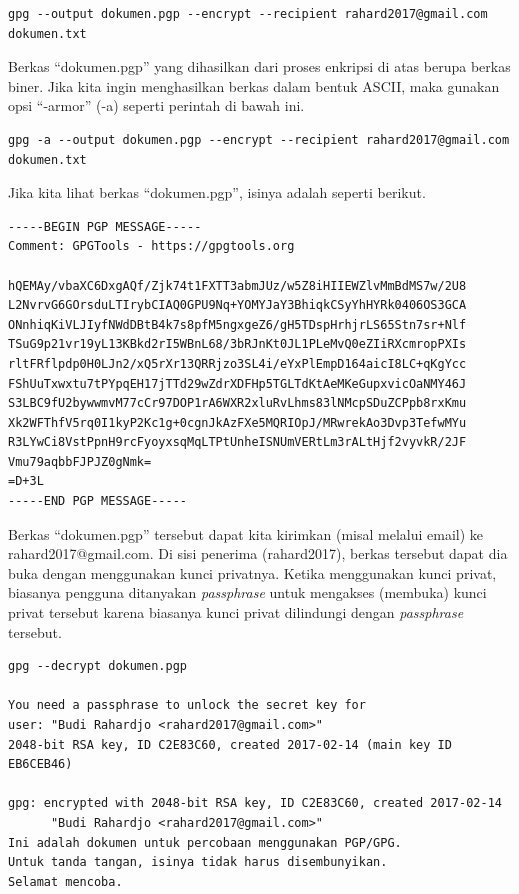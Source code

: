 \begin{verbatim}
gpg --output dokumen.pgp --encrypt --recipient rahard2017@gmail.com dokumen.txt
\end{verbatim}

Berkas ``dokumen.pgp'' yang dihasilkan dari proses enkripsi di atas berupa
berkas biner. Jika kita ingin menghasilkan berkas dalam bentuk ASCII, maka
gunakan opsi ``-armor'' (-a) seperti perintah di bawah ini.

\begin{verbatim}
gpg -a --output dokumen.pgp --encrypt --recipient rahard2017@gmail.com dokumen.txt
\end{verbatim}

Jika kita lihat berkas ``dokumen.pgp'', isinya adalah seperti berikut.

\begin{mdframed}
\begin{verbatim}
-----BEGIN PGP MESSAGE-----
Comment: GPGTools - https://gpgtools.org

hQEMAy/vbaXC6DxgAQf/Zjk74t1FXTT3abmJUz/w5Z8iHIIEWZlvMmBdMS7w/2U8
L2NvrvG6GOrsduLTIrybCIAQ0GPU9Nq+YOMYJaY3BhiqkCSyYhHYRk0406OS3GCA
ONnhiqKiVLJIyfNWdDBtB4k7s8pfM5ngxgeZ6/gH5TDspHrhjrLS65Stn7sr+Nlf
TSuG9p21vr19yL13KBkd2rI5WBnL68/3bRJnKt0JL1PLeMvQ0eZIiRXcmropPXIs
rltFRflpdp0H0LJn2/xQ5rXr13QRRjzo3SL4i/eYxPlEmpD164aicI8LC+qKgYcc
FShUuTxwxtu7tPYpqEH17jTTd29wZdrXDFHp5TGLTdKtAeMKeGupxvicOaNMY46J
S3LBC9fU2bywwmvM77cCr97DOP1rA6WXR2xluRvLhms83lNMcpSDuZCPpb8rxKmu
Xk2WFThfV5rq0I1kyP2Kc1g+0cgnJkAzFXe5MQRIOpJ/MRwrekAo3Dvp3TefwMYu
R3LYwCi8VstPpnH9rcFyoyxsqMqLTPtUnheISNUmVERtLm3rALtHjf2vyvkR/2JF
Vmu79aqbbFJPJZ0gNmk=
=D+3L
-----END PGP MESSAGE-----
\end{verbatim}
\end{mdframed}

Berkas ``dokumen.pgp'' tersebut dapat kita kirimkan (misal melalui email) ke
rahard2017@gmail.com. Di sisi penerima (rahard2017), berkas tersebut dapat dia
buka dengan menggunakan kunci privatnya. Ketika menggunakan kunci privat,
biasanya pengguna ditanyakan {\em passphrase} untuk mengakses (membuka) kunci
privat tersebut karena biasanya kunci privat dilindungi dengan {\em passphrase}
tersebut.

\begin{mdframed}
\begin{verbatim}
gpg --decrypt dokumen.pgp

You need a passphrase to unlock the secret key for
user: "Budi Rahardjo <rahard2017@gmail.com>"
2048-bit RSA key, ID C2E83C60, created 2017-02-14 (main key ID EB6CEB46)

gpg: encrypted with 2048-bit RSA key, ID C2E83C60, created 2017-02-14
      "Budi Rahardjo <rahard2017@gmail.com>"
Ini adalah dokumen untuk percobaan menggunakan PGP/GPG.
Untuk tanda tangan, isinya tidak harus disembunyikan.
Selamat mencoba.
\end{verbatim}
\end{mdframed}

